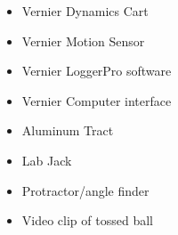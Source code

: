 \begin{itemize}
    \item {Vernier Dynamics Cart}
    \item {Vernier Motion Sensor}
    \item {Vernier LoggerPro software}
    \item {Vernier Computer interface}
    \item {Aluminum Tract}
    \item {Lab Jack}
    \item {Protractor/angle finder}
    \item {Video clip of tossed ball}
    \label{mat}
\end{itemize}


